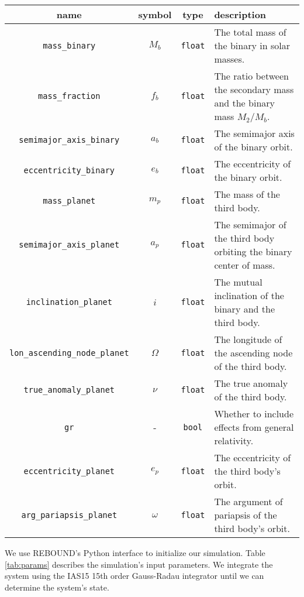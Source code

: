 \documentclass[twocolumn]{aastex631}
\begin{document}
\begin{table*}
    \begin{tabular}{cccp{}}
        \hline
        name & symbol & type & description \\
        \hline
        \texttt{mass\_binary} & $M_b$ & \texttt{float} & The total mass of the binary in solar masses. \\
        \texttt{mass\_fraction} & $f_b$ & \texttt{float} & The ratio between the secondary mass and the binary mass $M_2/M_b$. \\
        \texttt{semimajor\_axis\_binary} & $a_b$ & \texttt{float} & The semimajor axis of the binary orbit. \\
        \texttt{eccentricity\_binary} & $e_b$ & \texttt{float} & The eccentricity of the binary orbit. \\
        \texttt{mass\_planet} & $m_p$ & \texttt{float} & The mass of the third body. \\
        \texttt{semimajor\_axis\_planet} & $a_p$ & \texttt{float} & The semimajor of the third body orbiting the binary center of mass. \\
        \texttt{inclination\_planet} & $i$ & \texttt{float} & The mutual inclination of the binary and the third body. \\
        \texttt{lon\_ascending\_node\_planet} & $\Omega$ & \texttt{float} & The longitude of the ascending node of the third body. \\
        \texttt{true\_anomaly\_planet} & $\nu$ & \texttt{float} & The true anomaly of the third body. \\
        \texttt{gr} & - & \texttt{bool} & Whether to include effects from general relativity. \\
        \texttt{eccentricity\_planet} & $e_p$ & \texttt{float} & The eccentricity of the third body's orbit. \\
        \texttt{arg\_pariapsis\_planet} & $\omega$ & \texttt{float} & The argument of pariapsis of the third body's orbit. \\
        \hline
    \end{tabular}
    \caption{ {\sc REBOUND} Simulation parameters}
    \label{tab:params}
\end{table*}

We use {\sc REBOUND}'s Python interface to initialize our simulation. Table \ref{tab:params} describes the simulation's
input parameters. We integrate the system using the IAS15 15th order Gauss-Radau integrator \citep{reboundias15}
until we can determine the system's state.
\end{document}
